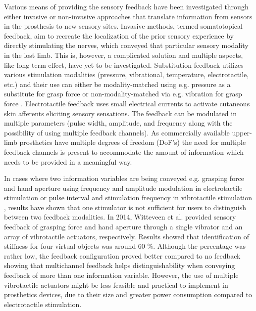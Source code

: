 %
Various means of providing the sensory feedback have been investigated through either invasive or non-invasive approaches that translate information from sensors in the prosthesis to new sensory sites. Invasive methods, termed somatotopical feedback, aim to recreate the localization of the prior sensory experience by directly stimulating the nerves, which conveyed that particular sensory modality in the lost limb. This is, however, a complicated solution and multiple aspects, like long term effect, have yet to be investigated. \cite{Schofield2014,Stephens-Fripp2018} 
Substitution feedback utilizes various stimulation modalities (pressure, vibrational, temperature, electrotactile, etc.) and their use can either be modality-matched using e.g. pressure as a substitute for grasp force \cite{Godfrey2017} or non-modality-matched via e.g. vibration for grasp force \cite{Ninu2014,Nabeel2016}. 
Electrotactile feedback uses small electrical currents to activate cutaneous skin afferents eliciting sensory sensations. The feedback can be modulated in multiple parameters (pulse width, amplitude, and frequency along with the possibility of using multiple feedback channels). \cite{Geng2012} As commercially available upper-limb prosthetics have multiple degrees of freedom (DoF's) \cite{Cordella2016} the need for multiple feedback channels is present to accommodate the amount of information which needs to be provided in a meaningful way. 

%
In cases where two information variables are being conveyed e.g. grasping force and hand aperture using frequency and amplitude modulation in electrotactile stimulation \cite{Prior1976} or pulse interval and stimulation frequency in vibrotactile stimulation \cite{Chatterjee2008}, results have shown that one stimulator is not sufficient for users to distinguish between two feedback modalities. In 2014, Witteveen et al. \cite{Witteveen2014} provided sensory feedback of grasping force and hand aperture through a single vibrator and an array of vibrotactile actuators, respectively. Results showed that identification of stiffness for four virtual objects was around 60 $\%$. Although the percentage was rather low, the feedback configuration proved better compared to no feedback showing that multichannel feedback helps distinguishability when conveying feedback of more than one information variable. \cite{Witteveen2014} However, the use of multiple vibrotactile actuators might be less feasible and practical to implement in prosthetics devices, due to their size and greater power consumption compared to electrotactile stimulation.  

